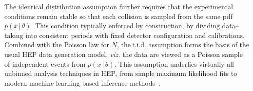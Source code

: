         The identical distribution assumption further requires that the experimental conditions remain stable so that each collision is sampled from the same pdf $p(x\,|\,\theta)$.
        This condition typically enforced by construction, by dividing data--taking into consistent periods with fixed detector configuration and calibrations.
        Combined with the Poisson law for $N$, the i.i.d. assumption forms the basis of the usual HEP data generation model, \textit{viz.}
        the data are viewed as a Poisson sample of independent events from $p(x\,|\,\theta)$.
        This assumption underlies virtually all unbinned analysis techniques in HEP, from simple maximum likelihood fits to modern machine learning based inference methods~\cite{Langenbruch:2025tvd, Weisser:2016cnc, Schofbeck:2024zjo, Brehmer:2020cvb, Stakia:2021pvp}.
        
